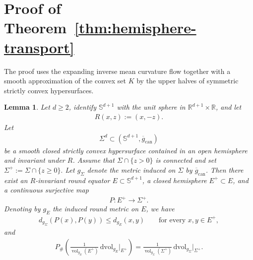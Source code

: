 \documentclass[11pt,reqno]{amsart}
\numberwithin{equation}{section}
\newtheorem{lem}[thm]{Lemma}
\theoremstyle{definition}
\theoremstyle{remark}
\def\bR {\mathbb{R}}
\def\bS {\mathbb{S}}
\newcommand{\0}{\emptyset}
\newcommand{\can}{\mathrm{can}}
\newcommand{\vol}{\operatorname{vol}}
\newcommand{\dvol}{\,\mathrm{dvol}}
\begin{document}
\section{Proof of Theorem~\ref{thm:hemisphere-transport}}
The proof uses the expanding inverse mean curvature flow together with a smooth approximation of the convex set $K$ by the upper halves of symmetric strictly convex hypersurfaces.
\begin{lem}\label{lem:hemisphere-smooth-symmetric-transport}
Let $d\geq2$, identify $\bS^{d+1}$ with the unit sphere in
$\bR^{d+1}\times\bR$, and let
\begin{align}
        R(x,z):=(x,-z).
\end{align}
Let
\begin{align}
        \Sigma^d
        \subset
        (\bS^{d+1},\overline g_{\can})
\end{align}
be a smooth closed strictly convex hypersurface contained in an open
hemisphere and invariant under $R$. Assume that
$\Sigma\cap\{z>0\}$ is connected and set $\Sigma^+ := \Sigma\cap\{z\geq0\}.$ Let $g_\Sigma$ denote the metric induced on $\Sigma$ by
$\overline g_{\can}$. Then there exist an $R$-invariant round equator $E\subset\bS^{d+1}$, a closed hemisphere $E^+\subset E$, and a continuous surjective map
\begin{align}
        P:E^+\to\Sigma^+.
\end{align}
Denoting by $g_E$ the induced round metric on $E$, we have
\begin{align}\label{eq:hemisphere-smooth-half-contraction}
        d_{g_\Sigma}(P(x),P(y))
        \leq
        d_{g_E}(x,y)
        \qquad
        \text{for every }x,y\in E^+,
\end{align}
and
\begin{align}\label{eq:hemisphere-smooth-half-pushforward}
        P_\#\left(
        \frac{1}{\vol_{g_E}(E^+)}
        \dvol_{g_E}|_{E^+}
        \right)
        =
        \frac{1}{\vol_{g_\Sigma}(\Sigma^+)}
        \dvol_{g_\Sigma}|_{\Sigma^+}.
\end{align}
\end{lem}
\end{document}
